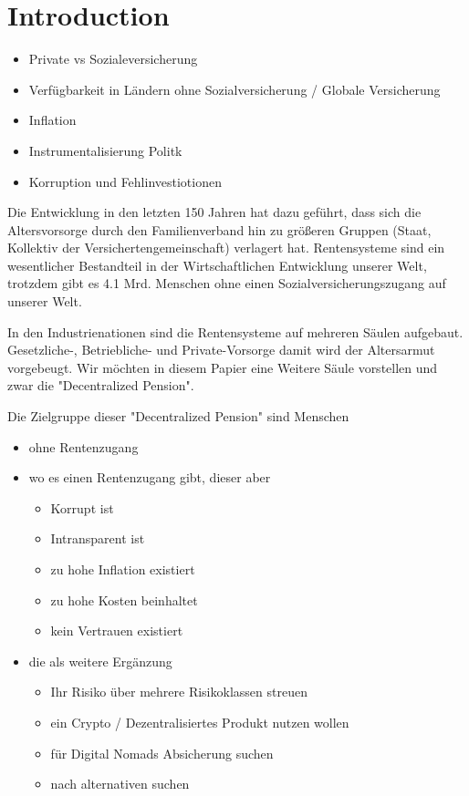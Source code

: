 \section{Introduction}




\begin{itemize}
\item Private vs Sozialeversicherung
\item Verfügbarkeit in Ländern ohne Sozialversicherung / Globale Versicherung
\item Inflation
\item Instrumentalisierung Politk
\item Korruption und Fehlinvestiotionen
\end{itemize}

Die Entwicklung in den letzten 150 Jahren hat dazu geführt, dass sich die Altersvorsorge durch den Familienverband hin zu größeren Gruppen (Staat, Kollektiv der Versichertengemeinschaft) verlagert hat. Rentensysteme sind ein wesentlicher Bestandteil in der Wirtschaftlichen Entwicklung unserer Welt, trotzdem gibt es 4.1 Mrd. Menschen ohne einen Sozialversicherungszugang auf unserer Welt. 

In den Industrienationen sind die Rentensysteme auf mehreren Säulen aufgebaut. Gesetzliche-, Betriebliche- und Private-Vorsorge damit wird der Altersarmut vorgebeugt. Wir möchten in diesem Papier eine Weitere Säule vorstellen und zwar die "Decentralized Pension". 


Die Zielgruppe dieser "Decentralized Pension" sind Menschen

\begin{itemize}
\item ohne Rentenzugang
\item wo es einen Rentenzugang gibt, dieser aber 
 \begin{itemize}
 \item Korrupt ist
 \item Intransparent ist
 \item zu hohe Inflation existiert
 \item zu hohe Kosten beinhaltet
 \item kein Vertrauen existiert
 \end{itemize}
\item die als weitere Ergänzung 
 \begin{itemize}
 \item Ihr Risiko über mehrere Risikoklassen streuen
 \item ein Crypto / Dezentralisiertes Produkt nutzen wollen
 \item für Digital Nomads Absicherung suchen
 \item nach alternativen suchen
 \end{itemize}
\end{itemize}



